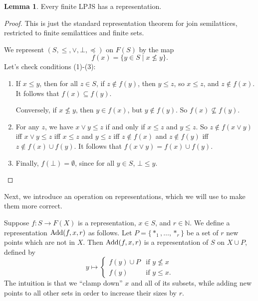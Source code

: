 \documentclass[12pt]{article}
\theoremstyle{definition}
\newtheorem{lemma}[theorem]{Lemma}
\begin{document}
\begin{lemma}\label{lem:base}
Every finite LPJS has a representation. 
\end{lemma}
\begin{proof}
This is just the standard representation theorem for join semilattices, restricted to finite semilattices and finite sets. 

We represent $(S,\leq,\vee,\bot,\preceq)$ on $F(S)$ by the map $$f(x) = \{y\in S\mid x\not\leq y\}.$$
Let's check conditions (1)-(3):
\begin{enumerate}[(1)]
\item If $x\leq y$, then for all $z\in S$, if $z\notin f(y)$, then $y\leq z$, so $x\leq z$, and $z\notin f(x)$. It follows that $f(x)\subseteq f(y)$. 

Conversely, if $x\not\leq y$, then $y\in f(x)$, but $y\notin f(y)$. So $f(x)\not\subseteq f(y)$.

\item For any $z$, we have $x\vee y\leq z$ if and only if $x \leq z$ and $y\leq z$. So $z\notin f(x\vee y)$ iff $x\lor y \leq z$ iff $x\leq z$ and $y\leq z$ iff $z\notin f(x)$ and $z\notin f(y)$ iff $z\notin f(x)\cup f(y)$. It follows that $f(x\vee y) = f(x) \cup f(y)$. 

\item Finally, $f(\bot) = \emptyset$, since for all $y\in S$, $\bot \leq y$. \qedhere
\end{enumerate}
\end{proof}

Next, we introduce an operation on representations, which we will use to make them more correct. 

Suppose $f\colon S\to F(X)$ is a representation, $x\in S$, and $r\in \mathbb{N}$. We define a  representation $\text{Add}(f,x,r)$ as follows. Let $P = \{*_1,\dots,*_r\}$ be a set of $r$ new points which are not in $X$. Then $\text{Add}(f,x,r)$ is a representation of $S$ on $X\cup P$, defined by $$y\mapsto \begin{cases} f(y)\cup P & \text{if }y\not\leq x\\ f(y) &\text{if }y\leq x.
\end{cases}$$
The intuition is that we ``clamp down'' $x$ and all of its subsets, while adding new points to all other sets in order to increase their sizes by $r$. 
\end{document}
